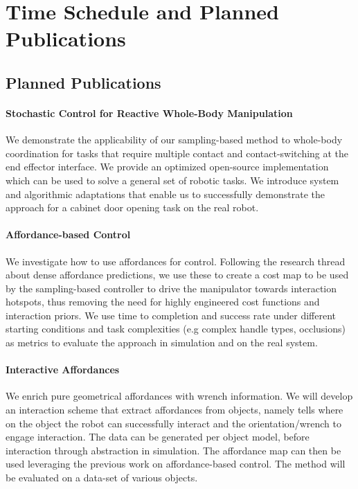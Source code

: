 \section{Time Schedule and Planned Publications}
\label{sec:time_schedule}


\subsection{Planned Publications}
\paragraph{Stochastic Control for Reactive Whole-Body Manipulation} We demonstrate the applicability of our sampling-based method to whole-body coordination for tasks that require multiple contact and contact-switching at the end effector interface. We provide an optimized open-source implementation which can be used to solve a general set of robotic tasks. We introduce system and algorithmic adaptations that enable us to successfully demonstrate the approach for a cabinet door opening task on the real robot.

\paragraph{Affordance-based Control} We investigate how to use affordances for control. Following the research thread about dense affordance predictions, we use these to create a cost map to be used by the sampling-based controller to drive the manipulator towards interaction hotspots, thus removing the need for highly engineered cost functions and interaction priors. We use time to completion and success rate under different starting conditions and task complexities (e.g complex handle types, occlusions) as metrics to evaluate the approach in simulation and on the real system. 

\paragraph{Interactive Affordances} We enrich pure geometrical affordances with wrench information. We will develop an interaction scheme that extract affordances from objects, namely tells where on the object the robot can successfully interact and the orientation/wrench to engage interaction. The data can be generated per object model, before interaction through abstraction in simulation. The affordance map can then be used leveraging the previous work on affordance-based control. The method will be evaluated on a data-set of various objects. 

